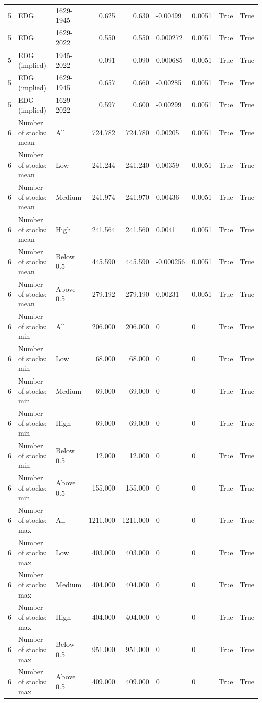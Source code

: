 \documentclass[10pt]{article}
\begin{document}
\begin{landscape}
\begin{longtable}{rllrrllrr}
5 & EDG & 1629-1945 & 0.625 & 0.630 & -0.00499 & 0.0051 & True & True \\
5 & EDG & 1629-2022 & 0.550 & 0.550 & 0.000272 & 0.0051 & True & True \\
5 & EDG (implied) & 1945-2022 & 0.091 & 0.090 & 0.000685 & 0.0051 & True & True \\
5 & EDG (implied) & 1629-1945 & 0.657 & 0.660 & -0.00285 & 0.0051 & True & True \\
5 & EDG (implied) & 1629-2022 & 0.597 & 0.600 & -0.00299 & 0.0051 & True & True \\
6 & Number of stocks: mean & All & 724.782 & 724.780 & 0.00205 & 0.0051 & True & True \\
6 & Number of stocks: mean & Low & 241.244 & 241.240 & 0.00359 & 0.0051 & True & True \\
6 & Number of stocks: mean & Medium & 241.974 & 241.970 & 0.00436 & 0.0051 & True & True \\
6 & Number of stocks: mean & High & 241.564 & 241.560 & 0.0041 & 0.0051 & True & True \\
6 & Number of stocks: mean & Below 0.5 & 445.590 & 445.590 & -0.000256 & 0.0051 & True & True \\
6 & Number of stocks: mean & Above 0.5 & 279.192 & 279.190 & 0.00231 & 0.0051 & True & True \\
6 & Number of stocks: min & All & 206.000 & 206.000 & 0 & 0 & True & True \\
6 & Number of stocks: min & Low & 68.000 & 68.000 & 0 & 0 & True & True \\
6 & Number of stocks: min & Medium & 69.000 & 69.000 & 0 & 0 & True & True \\
6 & Number of stocks: min & High & 69.000 & 69.000 & 0 & 0 & True & True \\
6 & Number of stocks: min & Below 0.5 & 12.000 & 12.000 & 0 & 0 & True & True \\
6 & Number of stocks: min & Above 0.5 & 155.000 & 155.000 & 0 & 0 & True & True \\
6 & Number of stocks: max & All & 1211.000 & 1211.000 & 0 & 0 & True & True \\
6 & Number of stocks: max & Low & 403.000 & 403.000 & 0 & 0 & True & True \\
6 & Number of stocks: max & Medium & 404.000 & 404.000 & 0 & 0 & True & True \\
6 & Number of stocks: max & High & 404.000 & 404.000 & 0 & 0 & True & True \\
6 & Number of stocks: max & Below 0.5 & 951.000 & 951.000 & 0 & 0 & True & True \\
6 & Number of stocks: max & Above 0.5 & 409.000 & 409.000 & 0 & 0 & True & True \\
\end{longtable}


\end{landscape}
\end{document}
